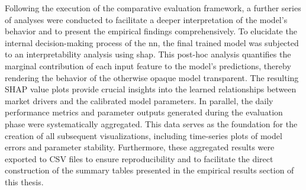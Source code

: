 Following the execution of the comparative evaluation framework, a further series of analyses were conducted to facilitate a deeper interpretation of the model's behavior and to present the empirical findings comprehensively. To elucidate the internal decision-making process of the \ac{nn}, the final trained model was subjected to an interpretability analysis using \ac{shap}. This post-hoc analysis quantifies the marginal contribution of each input feature to the model's predictions, thereby rendering the behavior of the otherwise opaque model transparent. The resulting SHAP value plots provide crucial insights into the learned relationships between market drivers and the calibrated model parameters. In parallel, the daily performance metrics and parameter outputs generated during the evaluation phase were systematically aggregated. This data serves as the foundation for the creation of all subsequent visualizations, including time-series plots of model errors and parameter stability. Furthermore, these aggregated results were exported to CSV files to ensure reproducibility and to facilitate the direct construction of the summary tables presented in the empirical results section of this thesis.

